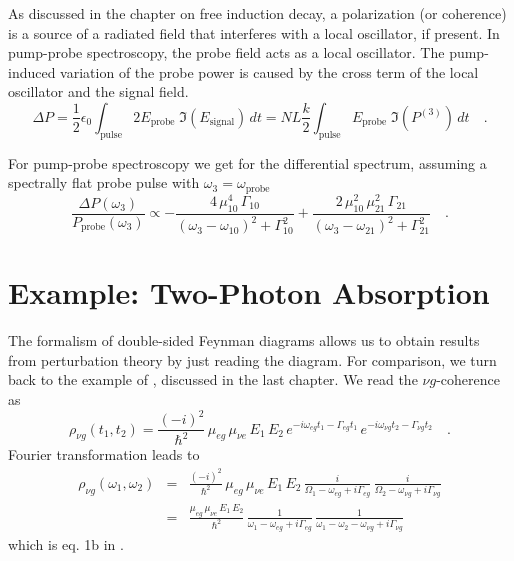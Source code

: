As discussed in the chapter on free induction decay, a polarization (or coherence) is a source of a radiated field that interferes with a local oscillator, if present. In pump-probe spectroscopy, the probe field acts as a local oscillator. The pump-induced variation of the probe power is caused by the cross term of the local oscillator and the signal field.
\begin{equation}
 \Delta P = \frac{1}{2} \epsilon_0 \int_\text{pulse}  2 E_\text{probe} \; \Im (E_\text{signal} ) \, dt 
 = N L \frac{k}{2}  \int_\text{pulse}   E_\text{probe} \; \Im ( P^{(3)} ) \, dt \quad .
\end{equation}

For pump-probe spectroscopy we get for the differential spectrum, assuming a spectrally flat probe pulse with $\omega_3 = \omega_\text{probe}$
\begin{equation}
\frac{\Delta P (\omega_3)} {P_\text{probe}(\omega_3)} 
\propto
- \frac{4 \, \mu_{10}^4 \, \Gamma_{10} } { (\omega_3 - \omega_{10})^2 + \Gamma_{10}^2} 
+ \frac{2 \, \mu_{10}^2  \, \mu_{21}^2 \, \Gamma_{21} } { (\omega_3 - \omega_{21})^2 + \Gamma_{21}^2}  \quad .
\end{equation}


\section{Example: Two-Photon Absorption}

The formalism of double-sided Feynman diagrams allows us to obtain results from perturbation theory by just reading the diagram. For comparison, we turn back to the example of \cite{Winterhalder11}, discussed in the last chapter. We read the $\nu g $-coherence as
\begin{equation}
\rho_{\nu g}(t_1, t_2) = \frac{(-i)^2}{\hbar^2} \, \mu_{eg} \, \mu_{\nu e} \, E_1 \, E_2 \,
e^{-i \omega_{eg} t_1 - \Gamma_{eg} t_1} \, 
e^{-i \omega_{\nu g} t_2 - \Gamma_{\nu g} t_2}  \quad .
\end{equation}
Fourier transformation leads to
\begin{eqnarray}
\rho_{\nu g}(\omega_1, \omega_2) &=& \frac{(-i)^2}{\hbar^2} \, \mu_{eg} \, \mu_{\nu e} \, E_1 \, E_2 \,
    \frac{i }{\Omega_1 - \omega_{eg}  + i \Gamma_{eg} } 
  \, \frac{i }{\Omega_2  -\omega_{\nu g}  + i \Gamma_{\nu g} } \\
  &=& \frac{\mu_{eg} \, \mu_{\nu e} \, E_1 \, E_2 }{\hbar^2} \,
  \frac{1 }{\omega_1 - \omega_{eg}  + i \Gamma_{eg} } 
  \, \frac{1}{\omega_1 - \omega_2  -\omega_{\nu g}  + i \Gamma_{\nu g} } 
\end{eqnarray}
which is eq. 1b in \cite{Winterhalder11}.
 

